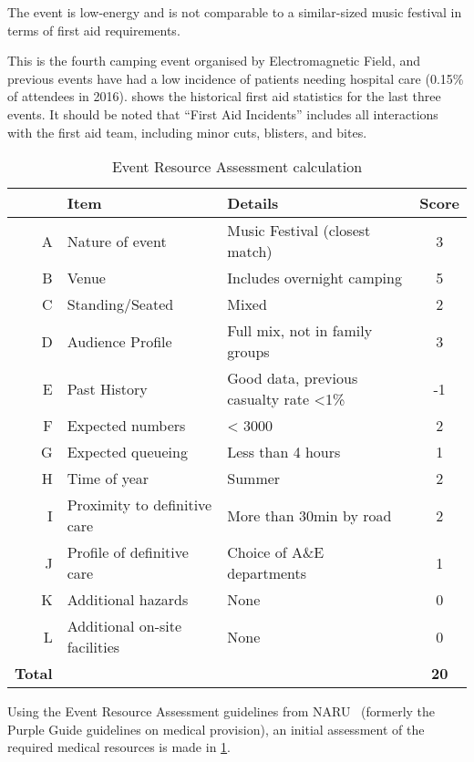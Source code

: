 The event is low-energy and is not comparable to a similar-sized music festival
in terms of first aid requirements.

This is the fourth camping event organised by Electromagnetic Field, and previous
events have had a low incidence of patients needing hospital care (0.15\% of
attendees in 2016).  shows the historical first aid
statistics for the last three events. It should be noted that ``First Aid Incidents''
includes all interactions with the first aid team, including minor cuts, blisters,
and bites.

\begin{table}[h!]
    \caption{Event Resource Assessment calculation}
    \label{table:narucalc}
    \centering
    \begin{tabular}{| r l l c |}
        \hline
           & \textbf{Item} & \textbf{Details} & \textbf{Score} \\
        \hline
        A & Nature of event & Music Festival (closest match) & 3 \\
          B & Venue & Includes overnight camping & 5 \\
          C & Standing/Seated & Mixed & 2 \\
          D & Audience Profile & Full mix, not in family groups & 3 \\
          E & Past History & Good data, previous casualty rate <1\% & -1 \\
          F & Expected numbers & < 3000 & 2 \\
          G & Expected queueing & Less than 4 hours & 1 \\
          H & Time of year & Summer & 2 \\
          I & Proximity to definitive care & More than 30min by road & 2 \\
          J & Profile of definitive care & Choice of A\&E departments & 1 \\
          K & Additional hazards & None & 0 \\
          L & Additional on-site facilities & None & 0 \\
          \textbf{Total} & & & \textbf{20} \\
        \hline
    \end{tabular}
\end{table}

Using the Event Resource Assessment guidelines from NARU~\cite{naru} (formerly
the Purple Guide guidelines on medical provision), an initial assessment of the
required medical resources is made in \cref{table:narucalc}.

